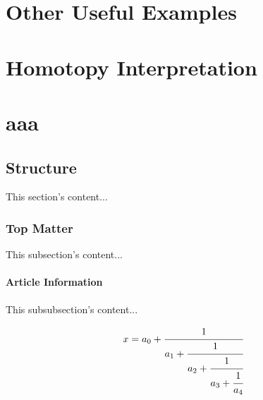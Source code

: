 \documentclass[12pt,a4paper]{report}
\begin{document}
\chapter{Other Useful Examples}

\chapter{Homotopy Interpretation}

\chapter{aaa}
\section{Structure}
This section's content...

\subsection{Top Matter}
This subsection's content...

\subsubsection{Article Information}
This subsubsection's content...

\begin{equation}
    x = a_0 + \cfrac{1}{a_1 
            + \cfrac{1}{a_2 
            + \cfrac{1}{a_3 + \cfrac{1}{a_4} } } }
  \end{equation}



\end{document}
